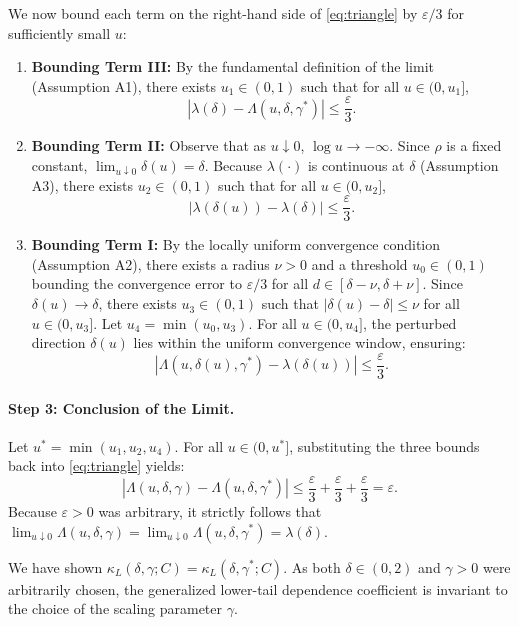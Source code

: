 \documentclass{article}
\begin{document}
We now bound each term on the right-hand side of \eqref{eq:triangle} by $\varepsilon/3$ for sufficiently small $u$:

\begin{enumerate}
    \item \textbf{Bounding Term III:} By the fundamental definition of the limit (Assumption A1), there exists $u_1 \in (0,1)$ such that for all $u \in (0, u_1]$, 
    \[ |\lambda(\delta) - \Lambda(u, \delta, \gamma^*)| \le \frac{\varepsilon}{3}. \]
    
    \item \textbf{Bounding Term II:} Observe that as $u \downarrow 0$, $\log u \to -\infty$. Since $\rho$ is a fixed constant, $\lim_{u\downarrow 0} \delta(u) = \delta$. Because $\lambda(\cdot)$ is continuous at $\delta$ (Assumption A3), there exists $u_2 \in (0,1)$ such that for all $u \in (0, u_2]$, 
    \[ |\lambda(\delta(u)) - \lambda(\delta)| \le \frac{\varepsilon}{3}. \]

    \item \textbf{Bounding Term I:} By the locally uniform convergence condition (Assumption A2), there exists a radius $\nu > 0$ and a threshold $u_0 \in (0,1)$ bounding the convergence error to $\varepsilon/3$ for all $d \in [\delta-\nu, \delta+\nu]$. Since $\delta(u) \to \delta$, there exists $u_3 \in (0,1)$ such that $|\delta(u) - \delta| \le \nu$ for all $u \in (0, u_3]$. Let $u_4 = \min(u_0, u_3)$. For all $u \in (0, u_4]$, the perturbed direction $\delta(u)$ lies within the uniform convergence window, ensuring:
    \[ |\Lambda(u, \delta(u), \gamma^*) - \lambda(\delta(u))| \le \frac{\varepsilon}{3}. \]
\end{enumerate}

\paragraph{Step 3: Conclusion of the Limit.}
Let $u^* = \min(u_1, u_2, u_4)$. For all $u \in (0, u^*]$, substituting the three bounds back into \eqref{eq:triangle} yields:
\[
|\Lambda(u, \delta, \gamma) - \Lambda(u, \delta, \gamma^*)| \le \frac{\varepsilon}{3} + \frac{\varepsilon}{3} + \frac{\varepsilon}{3} = \varepsilon.
\]
Because $\varepsilon > 0$ was arbitrary, it strictly follows that $\lim_{u \downarrow 0} \Lambda(u, \delta, \gamma) = \lim_{u \downarrow 0} \Lambda(u, \delta, \gamma^*) = \lambda(\delta)$. 

We have shown $\kappa_L(\delta,\gamma;C) = \kappa_L(\delta,\gamma^*;C)$. As both $\delta \in (0,2)$ and $\gamma > 0$ were arbitrarily chosen, the generalized lower-tail dependence coefficient is invariant to the choice of the scaling parameter $\gamma$. \hfill \qedsymbol
\end{document}
